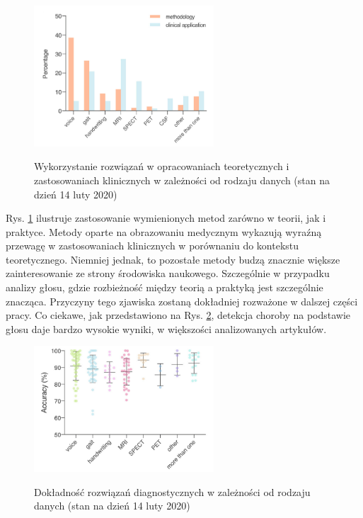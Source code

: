 \begin{figure}[htbp]
	\centering\includegraphics[width=0.6\textwidth]{./img/plot_PD_detection_methods}~\caption{Wykorzystanie rozwiązań w opracowaniach teoretycznych i zastosowaniach klinicznych w zależności od rodzaju danych (stan na dzień 14 luty 2020) \cite{ML_for_PD_review} }
    \label{fig:pd_detection_methods}
\end{figure}


Rys. \ref{fig:pd_detection_methods} ilustruje zastosowanie wymienionych metod zarówno w teorii, jak i praktyce.
Metody oparte na obrazowaniu medycznym wykazują wyraźną przewagę w zastosowaniach klinicznych w porównaniu do kontekstu teoretycznego.
Niemniej jednak, to pozostałe metody budzą znacznie większe zainteresowanie ze strony środowiska naukowego.
Szczególnie w przypadku analizy głosu, gdzie rozbieżność między teorią a praktyką jest szczególnie znacząca.
Przyczyny tego zjawiska zostaną dokładniej rozważone w dalszej części pracy.
Co ciekawe, jak przedstawiono na Rys. \ref{fig:pd_accuracy_methods}, detekcja choroby na podstawie głosu daje bardzo wysokie wyniki,
w większości analizowanych artykułów.

\begin{figure}[htbp]
	\centering
	\includegraphics[width=0.6\textwidth]{./img/accuracy}~\caption{Dokładność rozwiązań diagnostycznych w zależności od rodzaju danych (stan na dzień 14 luty 2020) \cite{ML_for_PD_review} }
    \label{fig:pd_accuracy_methods}
\end{figure}

